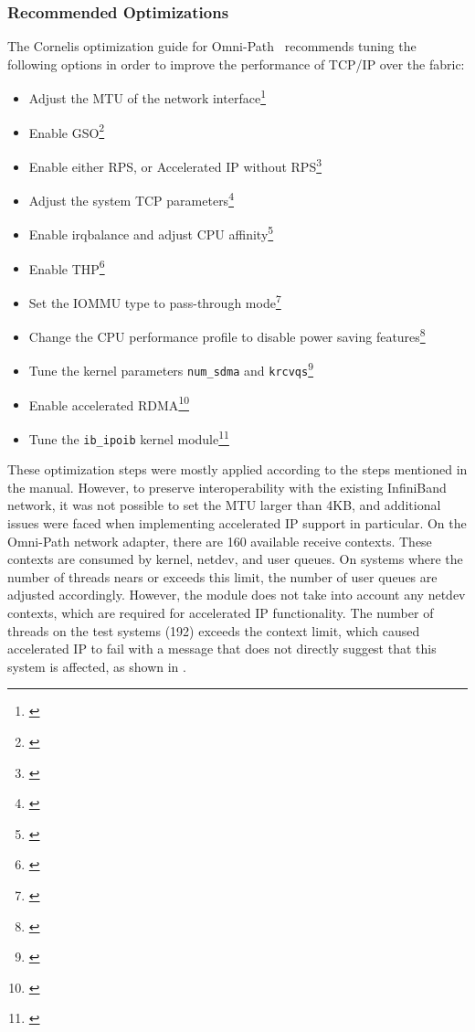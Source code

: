 \subsubsection{Recommended Optimizations}

The Cornelis optimization guide for Omni-Path~\cite{omni-path-tuning-guide}
recommends tuning the following options in order to improve the performance of
\ac{TCP/IP} over the fabric:

\begin{itemize}
    \item Adjust the \ac{MTU} of the network interface\footnote{\cite[pp.~71--75]{omni-path-tuning-guide}}
    \item Enable \ac{GSO}\footnote{\cite[pp.~76--77]{omni-path-tuning-guide}}
    \item Enable either \ac{RPS}, or Accelerated \ac{IP} without \ac{RPS}\footnote{\cite[p.~77]{omni-path-tuning-guide}}
    \item Adjust the system \ac{TCP} parameters\footnote{\cite[p.~77]{omni-path-tuning-guide}}
    \item Enable irqbalance and adjust \ac{CPU} affinity\footnote{\cite[p.~19,~pp.~81--84]{omni-path-tuning-guide}}
    \item Enable \ac{THP}\footnote{\cite[p.~24]{omni-path-tuning-guide}}
    \item Set the \ac{IOMMU} type to pass-through mode\footnote{\cite[pp.~23--24]{omni-path-tuning-guide}}
    \item Change the \ac{CPU} performance profile to disable power saving features\footnote{\cite[pp.~19--23]{omni-path-tuning-guide}}
    \item Tune the kernel parameters \texttt{num\_sdma} and \texttt{krcvqs}\footnote{\cite[pp.~34--37,~pp.~75--76]{omni-path-tuning-guide}}
    \item Enable accelerated \ac{RDMA}\footnote{\cite[pp.~62--64]{omni-path-tuning-guide}}
    \item Tune the \texttt{ib\_ipoib} kernel module\footnote{\cite[p.~76]{omni-path-tuning-guide}}
\end{itemize}

These optimization steps were mostly applied according to the steps mentioned in
the manual. However, to preserve interoperability with the existing InfiniBand
network, it was not possible to set the \ac{MTU} larger than 4KB, and additional
issues were faced when implementing accelerated \ac{IP} support in particular.
On the Omni-Path network adapter, there are 160 available receive contexts.
These contexts are consumed by kernel, netdev, and user queues. On systems where
the number of threads nears or exceeds this limit, the number of user queues are
adjusted accordingly. However, the module does not take into account any netdev
contexts, which are required for accelerated \ac{IP} functionality. The number
of threads on the test systems (192) exceeds the context limit, which caused
accelerated \ac{IP} to fail with a message that does not directly suggest that
this system is affected, as shown in
.

